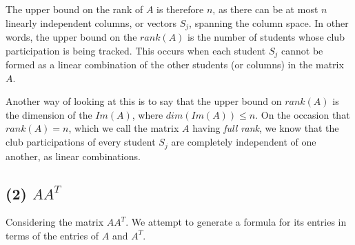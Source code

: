 \documentclass[12pt, letterpaper]{article}
\newcommand{\0}{\textbf{0}}
\newcommand{\1}{\textbf{1}}
\begin{document}
The upper bound on the rank of $A$ is therefore $n$, as there can be at most $n$ linearly independent columns, or vectors $S_j$, spanning the column space. In other words, the upper bound on the $rank(A)$ is the number of students whose club participation is being tracked. This occurs when each student $S_j$ cannot be formed as a linear combination of the other students (or columns) in the matrix $A$.

Another way of looking at this is to say that the upper bound on $rank(A)$ is the dimension of the $Im(A)$, where $dim(Im(A)) \le n$. On the occasion that $rank(A) = n$, which we call the matrix $A$ having \emph{full rank}, we know that the club participations of every student $S_j$ are completely independent of one another, as linear combinations.

\subsection*{(2) \textmd{$AA^T$}}

Considering the matrix $AA^T$. We attempt to generate a formula for its entries in terms of the entries of $A$ and $A^T$.
\end{document}
